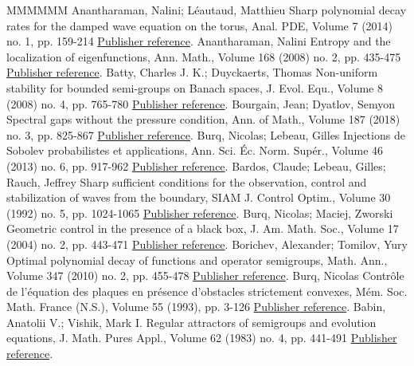 \documentclass[11pt]{article}
\theoremstyle{definition}
\numberwithin{equation}{section}
\numberwithin{figure}{section}
\numberwithin{table}{section}
\begin{document}
\begin{thebibliography}{MMMMMM}
 Anantharaman, Nalini; Léautaud, Matthieu Sharp polynomial decay rates for the damped wave equation on the torus, Anal. PDE, Volume 7 (2014) no. 1, pp. 159-214 \href{https://ahl.centre-mersenne.org/item/AHL_2020__3__1241_0/#Ana-Leau}{Publisher reference}.
 Anantharaman, Nalini Entropy and the localization of eigenfunctions, Ann. Math., Volume 168 (2008) no. 2, pp. 435-475 \href{https://ahl.centre-mersenne.org/item/AHL_2020__3__1241_0/#Anant}{Publisher reference}.
 Batty, Charles J. K.; Duyckaerts, Thomas Non-uniform stability for bounded semi-groups on Banach spaces, J. Evol. Equ., Volume 8 (2008) no. 4, pp. 765-780 \href{https://ahl.centre-mersenne.org/item/AHL_2020__3__1241_0/#Batty-Duyckaerts}{Publisher reference}.
 Bourgain, Jean; Dyatlov, Semyon Spectral gaps without the pressure condition, Ann. of Math., Volume 187 (2018) no. 3, pp. 825-867 \href{https://ahl.centre-mersenne.org/item/AHL_2020__3__1241_0/#BourgainDyatlov}{Publisher reference}.
 Burq, Nicolas; Lebeau, Gilles Injections de Sobolev probabilistes et applications, Ann. Sci. Éc. Norm. Supér., Volume 46 (2013) no. 6, pp. 917-962 \href{https://ahl.centre-mersenne.org/item/AHL_2020__3__1241_0/#Burq-Lebeau}{Publisher reference}.
 Bardos, Claude; Lebeau, Gilles; Rauch, Jeffrey Sharp sufficient conditions for the observation, control and stabilization of waves from the boundary, SIAM J. Control Optim., Volume 30 (1992) no. 5, pp. 1024-1065 \href{https://ahl.centre-mersenne.org/item/AHL_2020__3__1241_0/#BLR}{Publisher reference}.
 Burq, Nicolas; Maciej, Zworski Geometric control in the presence of a black box, J. Am. Math. Soc., Volume 17 (2004) no. 2, pp. 443-471 \href{https://ahl.centre-mersenne.org/item/AHL_2020__3__1241_0/#Burq-Zworski}{Publisher reference}.
 Borichev, Alexander; Tomilov, Yury Optimal polynomial decay of functions and operator semigroups, Math. Ann., Volume 347 (2010) no. 2, pp. 455-478 \href{https://ahl.centre-mersenne.org/item/AHL_2020__3__1241_0/#Bor-Tom}{Publisher reference}.
 Burq, Nicolas Contrôle de l’équation des plaques en présence d’obstacles strictement convexes, Mém. Soc. Math. France (N.S.), Volume 55 (1993), pp. 3-126 \href{https://ahl.centre-mersenne.org/item/AHL_2020__3__1241_0/#Burq-memoire}{Publisher reference}.
 Babin, Anatolii V.; Vishik, Mark I. Regular attractors of semigroups and evolution equations, J. Math. Pures Appl., Volume 62 (1983) no. 4, pp. 441-491 \href{https://ahl.centre-mersenne.org/item/AHL_2020__3__1241_0/#Babin-Vishik}{Publisher reference}.

\end{thebibliography}
\end{document}
